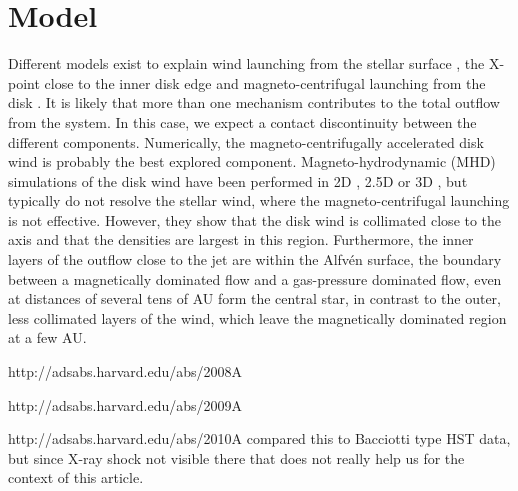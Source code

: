 \section{Model}
Different models exist to explain wind launching from the stellar surface \citep{1988ApJ...332L..41K,2005ApJ...632L.135M}, the X-point close to the inner disk edge \citep{1994ApJ...429..781S} and magneto-centrifugal launching from the disk \citep{1982MNRAS.199..883B,2005ApJ...630..945A}. It is likely that more than one mechanism contributes to the total outflow from the system. In this case, we expect a contact discontinuity between the different components. Numerically, the magneto-centrifugally accelerated disk wind is probably the best explored component. Magneto-hydrodynamic (MHD) simulations of the disk wind have been performed in 2D \citep{2005ApJ...630..945A}, 2.5D \citep{http://adsabs.harvard.edu/abs/2011ApJ...728L..11R} or 3D \citep{2006ApJ...653L..33A}, but typically do not resolve the stellar wind, where the magneto-centrifugal launching is not effective. However, they show that the disk wind is collimated close to the axis and that the densities are largest in this region. Furthermore, the inner layers of the outflow close to the jet are within the Alfv\'en surface, the boundary between a magnetically dominated flow and a gas-pressure dominated flow, even at distances of several tens of AU form the central star, in contrast to the outer, less collimated layers of the wind, which leave the magnetically dominated region at a few AU.

http://adsabs.harvard.edu/abs/2008A%

http://adsabs.harvard.edu/abs/2009A%

http://adsabs.harvard.edu/abs/2010A%
compared this to Bacciotti type HST data, but since X-ray shock not visible there that does not really help us for the context of this article.